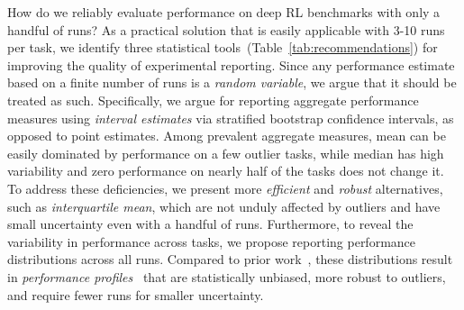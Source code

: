 How do we reliably evaluate performance on deep RL benchmarks with only a handful of runs? As a practical solution that is easily applicable with 3-10 runs per task, we identify three statistical tools~(Table~\ref{tab:recommendations}) for improving the quality of experimental reporting. Since any performance estimate based on a finite number of runs is a \emph{random variable}, we argue that it should be treated as such. Specifically, we argue for reporting aggregate performance measures using \emph{interval estimates} via stratified bootstrap confidence intervals, as opposed to point estimates. Among prevalent aggregate measures, mean can be easily dominated by performance on a few outlier tasks, while median has high variability and zero performance on nearly half of the tasks does not change it. 
To address these deficiencies, we present more \emph{efficient} and \emph{robust} alternatives, such as \emph{interquartile mean}, which are not unduly affected by outliers and have small uncertainty even with a handful of runs. Furthermore, to reveal the variability in performance across tasks, we propose reporting performance distributions across all runs. Compared to prior work~\citep{bellemare2013arcade, recht-2018}, these distributions result in \emph{performance profiles}~\citep{dolan2002benchmarking} that are statistically unbiased, more robust to outliers, and require fewer runs for smaller uncertainty. 






